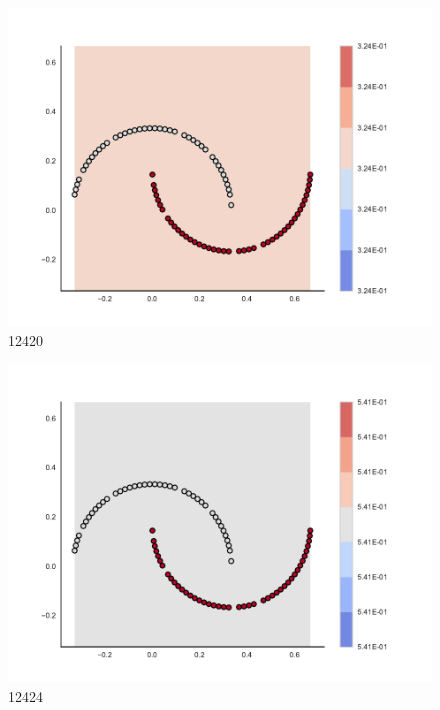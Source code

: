 \begin{subfigure}[b]{0.09\textwidth}
    \includegraphics[clip, trim=2.35cm 1.75cm 4.5cm 0cm,width=\textwidth]{img/convergence/12420.pdf}
    \caption{12420}
    \label{fig:convergence_12420}
\end{subfigure}
%
\begin{subfigure}[b]{0.09\textwidth}
    \includegraphics[clip, trim=2.35cm 1.75cm 4.5cm 0cm,width=\textwidth]{img/convergence/12424.pdf}
    \caption{12424}
    \label{fig:convergence_12424}
\end{subfigure}
%
